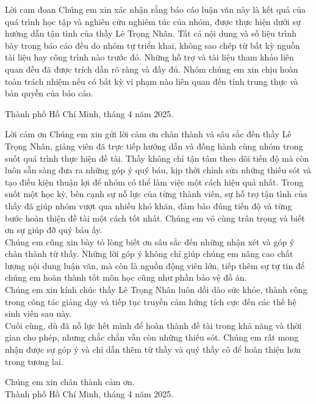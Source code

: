 \begin{preface}{Lời cam đoan}
    \tab Chúng em xin xác nhận rằng báo cáo luận văn này là kết quả của quá trình học tập và nghiên cứu nghiêm túc của nhóm, được thực hiện dưới sự hướng dẫn tận tình của thầy Lê Trọng Nhân. Tất cả nội dung và số liệu trình bày trong báo cáo đều do nhóm tự triển khai, không sao chép từ bất kỳ nguồn tài liệu hay công trình nào trước đó. Những hỗ trợ và tài liệu tham khảo liên quan đều đã được trích dẫn rõ ràng và đầy đủ. Nhóm chúng em xin chịu hoàn toàn trách nhiệm nếu có bất kỳ vi phạm nào liên quan đến tính trung thực và bản quyền của báo cáo.
    \begin{flushright}
    Thành phố Hồ Chí Minh, tháng 4 năm 2025.
    \end{flushright}
    \end{preface}
    \newpage
    \begin{preface}{Lời cảm ơn}
    \tab Chúng em xin gửi lời cảm ơn chân thành và sâu sắc đến thầy Lê Trọng Nhân, giảng viên đã trực tiếp hướng dẫn và đồng hành cùng nhóm trong suốt quá trình thực hiện đề tài. Thầy không chỉ tận tâm theo dõi tiến độ mà còn luôn sẵn sàng đưa ra những góp ý quý báu, kịp thời chỉnh sửa những thiếu sót và tạo điều kiện thuận lợi để nhóm có thể làm việc một cách hiệu quả nhất. Trong suốt một học kỳ, bên cạnh sự nỗ lực của từng thành viên, sự hỗ trợ tận tình của thầy đã giúp nhóm vượt qua nhiều khó khăn, đảm bảo đúng tiến độ và từng bước hoàn thiện đề tài một cách tốt nhất. Chúng em vô cùng trân trọng và biết ơn sự giúp đỡ quý báu ấy.\\
    \tab Chúng em cũng xin bày tỏ lòng biết ơn sâu sắc đến những nhận xét và góp ý chân thành từ thầy. Những lời góp ý không chỉ giúp chúng em nâng cao chất lượng nội dung luận văn, mà còn là nguồn động viên lớn, tiếp thêm sự tự tin để chúng em hoàn thành tốt môn học cũng như phần bảo vệ đồ án.\\
    \tab Chúng em xin kính chúc thầy Lê Trọng Nhân luôn dồi dào sức khỏe, thành công trong công tác giảng dạy và tiếp tục truyền cảm hứng tích cực đến các thế hệ sinh viên sau này.\\
    \tab Cuối cùng, dù đã nỗ lực hết mình để hoàn thành đề tài trong khả năng và thời gian cho phép, nhưng chắc chắn vẫn còn những thiếu sót. Chúng em rất mong nhận được sự góp ý và chỉ dẫn thêm từ thầy và quý thầy cô để hoàn thiện hơn trong tương lai.
    \begin{flushright}
    Chúng em xin chân thành cảm ơn.\\
    Thành phố Hồ Chí Minh, tháng 4 năm 2025.\\
    \end{flushright}
    \end{preface}
